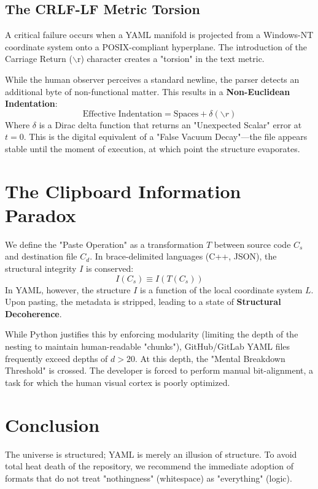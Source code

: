 \documentclass[11pt]{article}
\begin{document}
\subsection{The CRLF-LF Metric Torsion}
A critical failure occurs when a YAML manifold is projected from a Windows-NT coordinate system onto a POSIX-compliant hyperplane. The introduction of the Carriage Return ($\backslash$r) character creates a "torsion" in the text metric. 

While the human observer perceives a standard newline, the parser detects an additional byte of non-functional matter. This results in a \textbf{Non-Euclidean Indentation}:
\begin{equation}
    \text{Effective Indentation} = \text{Spaces} + \delta(\backslash r)
\end{equation}
Where $\delta$ is a Dirac delta function that returns an "Unexpected Scalar" error at $t=0$. This is the digital equivalent of a "False Vacuum Decay"—the file appears stable until the moment of execution, at which point the structure evaporates.


\section{The Clipboard Information Paradox}
We define the "Paste Operation" as a transformation $T$ between source code $C_s$ and destination file $C_d$. In brace-delimited languages (C++, JSON), the structural integrity $I$ is conserved:
\begin{equation}
    I(C_s) \equiv I(T(C_s))
\end{equation}
In YAML, however, the structure $I$ is a function of the local coordinate system $L$. Upon pasting, the metadata is stripped, leading to a state of \textbf{Structural Decoherence}. 

While Python justifies this by enforcing modularity (limiting the depth of the nesting to maintain human-readable "chunks"), GitHub/GitLab YAML files frequently exceed depths of $d > 20$. At this depth, the "Mental Breakdown Threshold" is crossed. The developer is forced to perform manual bit-alignment, a task for which the human visual cortex is poorly optimized.

\section{Conclusion}
The universe is structured; YAML is merely an illusion of structure. To avoid total heat death of the repository, we recommend the immediate adoption of formats that do not treat "nothingness" (whitespace) as "everything" (logic).
\end{document}
